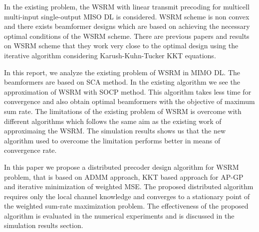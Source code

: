 In the existing problem, the \ac{WSRM} with linear transmit precoding for multicell multi-input single-output \ac{MISO} \ac{DL} is considered. \ac{WSRM} scheme is non convex and there exists beamformer designs which are based on achieving the necessary optimal conditions of the \ac{WSRM} scheme. There are previous papers and results on \ac{WSRM} scheme that they work very close to the optimal design using the iterative algorithm considering Karush-Kuhn-Tucker \ac{KKT} equations. 

In this report, we analyze the existing problem of \ac{WSRM} in \ac{MIMO} \ac{DL}. The beamformers are based on \ac{SCA} method. In the existing algorithm we see the approximation of \ac{WSRM} with \ac{SOCP} method. This algorithm takes less time for convergence and also obtain optimal beamformers with the objective of maximum sum rate. The limitations of the existing problem of \ac{WSRM} is overcome with different algorithms which follows the same aim as the existing work of approximaing the \ac{WSRM}. The simulation results shows us that the new algorithm used to overcome the limitation performs better in means of convergence rate.

In this paper we propose a distributed precoder design algorithm for \ac{WSRM} problem,  that is based on \ac{ADMM} approach, \ac{KKT} based approach for \ac{AP-GP} and iterative minimization of weighted  \ac{MSE}. The proposed distributed algorithm requires only the local channel knowledge and converges to a stationary point of the weighted sum-rate maximization problem. The effectiveness of the proposed algorithm is evaluated in the numerical experiments and is discussed in the simulation results section.


